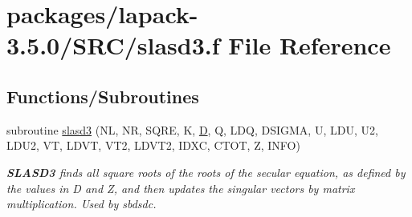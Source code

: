 \hypertarget{slasd3_8f}{}\section{packages/lapack-\/3.5.0/\+S\+R\+C/slasd3.f File Reference}
\label{slasd3_8f}
\subsection*{Functions/\+Subroutines}
\begin{DoxyCompactItemize}
\item 
subroutine \hyperlink{group__auxOTHERauxiliary_ga4359e33241fa45b40ca5b25e6bee9054}{slasd3} (N\+L, N\+R, S\+Q\+R\+E, K, \hyperlink{odrpack_8h_a7dae6ea403d00f3687f24a874e67d139}{D}, Q, L\+D\+Q, D\+S\+I\+G\+M\+A, U, L\+D\+U, U2, L\+D\+U2, V\+T, L\+D\+V\+T, V\+T2, L\+D\+V\+T2, I\+D\+X\+C, C\+T\+O\+T, Z, I\+N\+F\+O)
\begin{DoxyCompactList}\small\item\em {\bfseries S\+L\+A\+S\+D3} finds all square roots of the roots of the secular equation, as defined by the values in D and Z, and then updates the singular vectors by matrix multiplication. Used by sbdsdc. \end{DoxyCompactList}\end{DoxyCompactItemize}
